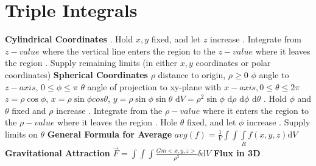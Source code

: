 \documentclass[twoside]{article}
\begin{document}
\section{Triple Integrals}
\indent\indent
\textbf{Cylindrical Coordinates}\newline
\indent{}. Hold $x,y$ fixed, and let $z$ increase\newline
\indent{}. Integrate from $z-value$ where the vertical line enters the region to the $z-value$ where it leaves the region\newline
\indent{}. Supply remaining limits (in either $x,y$ coordinates or polar coordinates)\newline
\indent
\textbf{Spherical Coordinates}\newline
\indent\indent
$\rho$ distance to origin, $\rho \geq 0$\newline
\indent\indent
$\phi$ angle to $z-axis$, $0 \leq \phi \leq \pi$\newline
\indent\indent
$\theta$ angle of projection to xy-plane with $x-axis, 0 \leq \theta \leq 2\pi$\newline\newline
\indent\indent
$z = \rho\cos\phi$, $x = \rho\sin\phi cos\theta$, $y = \rho\sin\phi \sin\theta$\newline
\indent\indent
$\mathrm{d}V = \rho^2\sin\phi$  $\mathrm{d}\rho$ $\mathrm{d}\phi$ $\mathrm{d}\theta$\newline\newline
\indent{}. Hold $\phi$ and $\theta$ fixed and $\rho$ increase\newline
\indent{}. Integrate from the $\rho-value$ where it enters the region to the $\rho-value$ where it leaves the region\newline
\indent{}. Hole $\theta$ fixed, and let $\phi$ increase\newline
\indent{}. Supply limits on $\theta$\newline\newline
\indent
\textbf{General Formula for Average}\newline
\indent\indent
$avg(f) = \frac{1}{V} \int\int\int\limits_R f(x,y,z)\mathrm{d}V$\newline
\indent
\textbf{Gravitational Attraction}\newline
\indent\indent
$\vec{F} = \int\int\int \frac{Gm<x,y,z>}{\rho^3} \delta \mathrm{d}V$\newline
\indent
\textbf{Flux in 3D}\newline
\indent\indent
\end{document}

